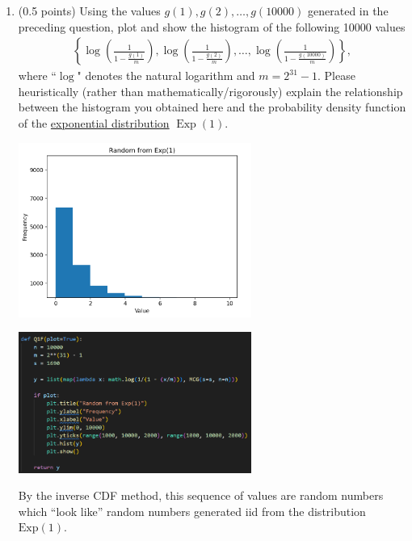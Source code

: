 \documentclass[11pt,letterpaper, leqno]{article}
\begin{document}
\begin{enumerate}
\begin{enumerate}
    \item (0.5 points) Using the values $g(1),g(2), \ldots, g(10000)$ generated in the preceding question, plot and show the histogram of the following 10000 values
    \begin{align*}
        \left\{\log\left(\frac{1}{1-\frac{g(1)}{m}}\right), \log\left(\frac{1}{1-\frac{g(2)}{m}}\right), \ldots, \log\left(\frac{1}{1-\frac{g(10000)}{m}}\right)\right\},
    \end{align*}
    where ``$\log$" denotes the natural logarithm and $m=2^{31}-1$. Please heuristically (rather than mathematically/rigorously) explain the relationship between the histogram you obtained here and the probability density function of the  \href{https://en.wikipedia.org/wiki/Exponential_distribution}{exponential distribution} $\operatorname{Exp}(1)$.

    \color{blue}
        \begin{center}
            \includegraphics[width=0.6\textwidth]{Images/1F Histogram.png}

            \includegraphics[width=0.6\textwidth]{Images/1F.png}

        \end{center}
        By the inverse CDF method, this sequence of values are random numbers which ``look like'' random numbers generated iid from the distribution $\text{Exp}(1)$.
    \color{black}
\end{enumerate}


\end{enumerate}
\end{document}
